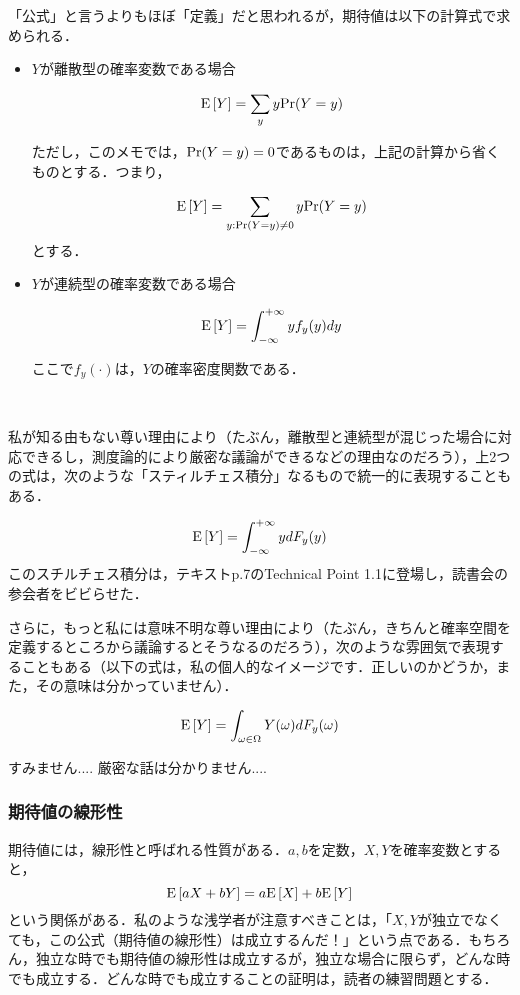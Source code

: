 \documentclass[12pt]{jsarticle}
\begin{document}
「公式」と言うよりもほぼ「定義」だと思われるが，期待値は以下の計算式で求められる．

\begin{itemize}
\item $Y$が離散型の確率変数である場合

\[
{\rm E}\left[Y\right]  = \sum_y y{\rm Pr}(Y = y)
\]

ただし，このメモでは，${\rm Pr}(Y=y)=0$であるものは，上記の計算から省くものとする．つまり，

\[
{\rm E}\left[Y\right]  = \sum_{y: {\rm Pr}(Y=y) \ne 0} y{\rm Pr}(Y = y)
\]
とする．

\item $Y$が連続型の確率変数である場合


\[
{\rm E}\left[Y\right]  = \int_{-\infty}^{+\infty} yf_y(y) dy
\]


ここで$f_y(\cdot)$は，$Y$の確率密度関数である．

\end{itemize}

\


私が知る由もない尊い理由により（たぶん，離散型と連続型が混じった場合に対応できるし，測度論的により厳密な議論ができるなどの理由なのだろう），上2つの式は，次のような「スティルチェス積分」なるもので統一的に表現することもある．

\[
{\rm E}\left[Y\right]  = \int_{-\infty}^{+\infty} y dF_y(y)
\]
このスチルチェス積分は，テキストp.7のTechnical Point 1.1に登場し，読書会の参会者をビビらせた．

さらに，もっと私には意味不明な尊い理由により（たぶん，きちんと確率空間を定義するところから議論するとそうなるのだろう），次のような雰囲気で表現することもある（以下の式は，私の個人的なイメージです．正しいのかどうか，また，その意味は分かっていません）．

\[
{\rm E}\left[Y\right]  = \int_{\omega \in \Omega} Y(\omega) dF_y(\omega)
\]

すみません.... 厳密な話は分かりません....

\subsubsection{期待値の線形性}\label{sec:linearexp}
期待値には，線形性と呼ばれる性質がある．$a, b$を定数，$X, Y$を確率変数とすると，
\[
{\rm E}\left[aX + bY\right] = a{\rm E}\left[X\right] + b{\rm E}\left[Y\right]  
\]
という関係がある．私のような浅学者が注意すべきことは，「$X, Y$が独立でなくても，この公式（期待値の線形性）は成立するんだ！」という点である．もちろん，独立な時でも期待値の線形性は成立するが，独立な場合に限らず，どんな時でも成立する．どんな時でも成立することの証明は，読者の練習問題とする．
\end{document}
